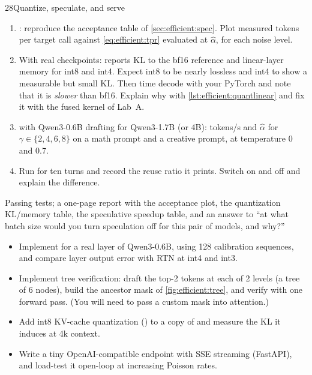 \begin{labbox}{28}{Quantize, speculate, and serve}
\begin{enumerate}
  \item {}: reproduce the acceptance table of
        \cref{sec:efficient:spec}. Plot measured tokens per target call against
        \cref{eq:efficient:tpr} evaluated at $\hat\alpha$, for each noise level.
  \item With real checkpoints:  reports KL to the bf16 reference and
        linear-layer memory for int8 and int4. Expect int8 to be nearly lossless and int4 to
        show a measurable but small KL. Then time decode with your PyTorch
         and note that it is \emph{slower} than bf16. Explain why
        with \cref{lst:efficient:quantlinear} and fix it with the fused kernel of Lab~A.
  \item {} with Qwen3-0.6B drafting for Qwen3-1.7B (or 4B): tokens/s and
        $\hat\alpha$ for $\gamma\in\{2,4,6,8\}$ on a math prompt and a creative prompt, at
        temperature 0 and 0.7.
  \item Run  for ten turns and record the reuse ratio it prints.
        Switch  on and off and explain the difference.
\end{enumerate}

Passing tests; a one-page report with the acceptance plot, the quantization KL/memory
table, the speculative speedup table, and an answer to ``at what batch size would you
turn speculation off for this pair of models, and why?''

\begin{itemize}
  \item Implement  for a real layer of Qwen3-0.6B, using 128
        calibration sequences, and compare layer output error with RTN at int4 and int3.
  \item Implement tree verification: draft the top-2 tokens at each of 2 levels (a tree of
        6 nodes), build the ancestor mask of \cref{fig:efficient:tree}, and verify with one
        forward pass. (You will need to pass a custom mask into attention.)
  \item Add int8 KV-cache quantization () to a copy of
         and measure the KL it induces at 4k context.
  \item Write a tiny OpenAI-compatible  endpoint with SSE
        streaming (FastAPI), and load-test it open-loop at increasing Poisson rates.
\end{itemize}
\end{labbox}
